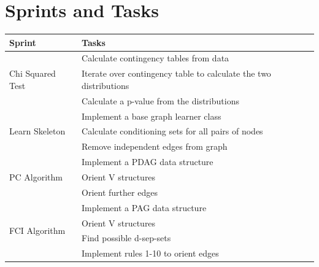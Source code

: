 \documentclass{UoYCSproject}
\begin{document}
\section{Sprints and Tasks}
\begin{tabular}{| l |p{9cm}|}
	\hline
	Sprint & Tasks\\
	\hline
	\multirow{3}{*}{Chi Squared Test} & Calculate contingency tables from data \\
	\cline{2-2}
	& Iterate over contingency table to calculate the two distributions \\
	\cline{2-2}
	& Calculate a p-value from the distributions \\
	\cline{2-2}
	\hline
	\multirow{3}{*}{Learn Skeleton} & Implement a base graph learner class\\
	\cline{2-2}
	& 
	Calculate conditioning sets for all pairs of nodes
	 \\
	\cline{2-2}
	& Remove independent edges from graph \\
	\cline{2-2}
	\hline
	\multirow{3}{*}{PC Algorithm} & 
	Implement a PDAG data structure \\
	\cline{2-2}
	& Orient V structures \\
	\cline{2-2}
	& Orient further edges \\
	\cline{2-2}
	\hline
	\multirow{4}{*}{FCI Algorithm} & Implement a PAG data structure \\
	\cline{2-2}
	& Orient V structures \\
	\cline{2-2}
	& Find possible d-sep-sets \\
	\cline{2-2}
	& Implement rules 1-10 to orient edges \\
	\cline{2-2}
	\hline
\end{tabular}
\end{document}
